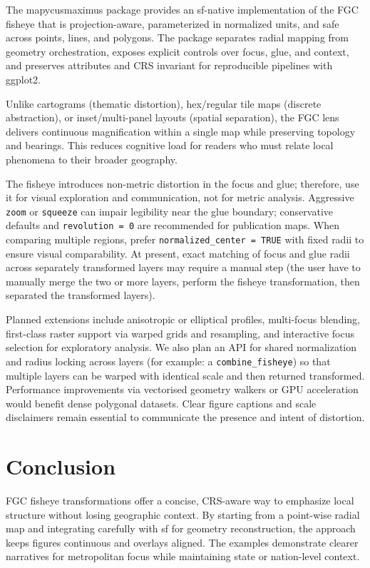 The mapycusmaximus package provides an sf-native implementation of the FGC fisheye that is projection-aware, parameterized in normalized units, and safe across points, lines, and polygons. The package separates radial mapping from geometry orchestration, exposes explicit controls over focus, glue, and context, and preserves attributes and CRS invariant for reproducible pipelines with ggplot2.

Unlike cartograms (thematic distortion), hex/regular tile maps (discrete abstraction), or inset/multi-panel layouts (spatial separation), the FGC lens delivers continuous magnification within a single map while preserving topology and bearings. This reduces cognitive load for readers who must relate local phenomena to their broader geography.

The fisheye introduces non-metric distortion in the focus and glue; therefore, use it for visual exploration and communication, not for metric analysis. Aggressive \texttt{zoom} or \texttt{squeeze} can impair legibility near the glue boundary; conservative defaults and \texttt{revolution\ =\ 0} are recommended for publication maps. When comparing multiple regions, prefer \texttt{normalized\_center\ =\ TRUE} with fixed radii to ensure visual comparability. At present, exact matching of focus and glue radii across separately transformed layers may require a manual step (the user have to manually merge the two or more layers, perform the fisheye transformation, then separated the transformed layers).

Planned extensions include anisotropic or elliptical profiles, multi-focus blending, first-class raster support via warped grids and resampling, and interactive focus selection for exploratory analysis. We also plan an API for shared normalization and radius locking across layers (for example: a \texttt{combine\_fisheye}) so that multiple layers can be warped with identical scale and then returned transformed. Performance improvements via vectorised geometry walkers or GPU acceleration would benefit dense polygonal datasets. Clear figure captions and scale disclaimers remain essential to communicate the presence and intent of distortion.

\section{Conclusion}\label{conclusion}

FGC fisheye transformations offer a concise, CRS-aware way to emphasize local structure without losing geographic context. By starting from a point-wise radial map and integrating carefully with sf for geometry reconstruction, the approach keeps figures continuous and overlays aligned. The examples demonstrate clearer narratives for metropolitan focus while maintaining state or nation-level context.

